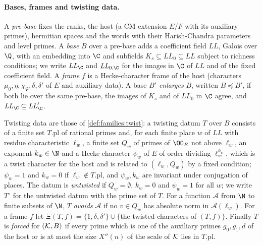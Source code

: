 \paragraph{Bases, frames and twisting data.}
A \emph{pre-base} fixes the ranks, the host (a CM extension $E/F$ with its auxiliary primes), hermitian spaces and the words
with their Harish-Chandra parameters and level primes. A \emph{base} $B$ over a pre-base adds a coefficient field
$\mathit{LL}$, Galois over $\Q$, with an embedding into $\C$ and subfields $K_s\subseteq\mathit{LL}_0\subseteq\mathit{LL}$
subject to richness conditions; we write $\mathit{LL}_\C$ and $\mathit{LL}_{0,\C}$ for the images in $\C$ of $\mathit{LL}$ and
of the fixed coefficient field. A \emph{frame} $f$ is a Hecke-character frame of the host (characters
$\mu_0,\eta,\chi_\Psi,\delta,\delta'$ of $E$ and auxiliary data). A base $B'$ \emph{enlarges} $B$, written $B\preceq B'$, if
both lie over the same pre-base, the images of $K_s$ and of $\mathit{LL}_0$ in $\C$ agree, and
$\mathit{LL}_\C\subseteq\mathit{LL}'_\C$.

Twisting data are those of \cref{def:families:twist}: a twisting datum $T$ over $B$ consists of a finite set
$T.\mathrm{pl}$ of rational primes and, for each finite place $w$ of $\mathit{LL}$ with residue characteristic $\ell_w$, a
finite set $Q_w$ of primes of $\OO_E$ not above $\ell_w$, an exponent $k_w\in\N$ and a Hecke character $\psi_w$ of $E$ of
order dividing $\ell_w^{k_w}$, which is a twist character for the host and is related to $(\ell_w,Q_w)$ by a fixed
condition; $\psi_w=1$ and $k_w=0$ if $\ell_w\notin T.\mathrm{pl}$, and $\psi_w,k_w$ are invariant under conjugation of places.
The datum is \emph{untwisted} if $Q_w=\emptyset$, $k_w=0$ and $\psi_w=1$ for all $w$; we write $T^\circ$ for the untwisted
datum with the prime set of $T$. For a function $\mathcal A$ from $\N$ to finite subsets of $\N$, $T$ \emph{avoids}
$\mathcal A$ if no $v\in Q_w$ has absolute norm in $\mathcal A(\ell_w)$. For a frame $f$ let $\Xi(T,f)=\{1,\delta,\delta'\}\cup\{$the
twisted characters of $(T,f)\}$. Finally $T$ is \emph{forced} for $(\mathcal K,B)$ if every prime which is one of the auxiliary
primes $g_0,g_1,d$ of the host or is at most the size $X''(n)$ of the scale of $\mathcal K$ lies in $T.\mathrm{pl}$.

